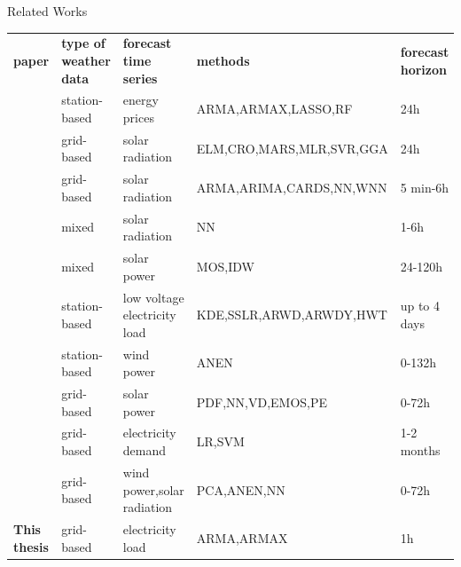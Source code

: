 \documentclass[t,xcolor={table},fleqn]{beamer}
\newcommand{\tcite}{\Textcite}
\begin{document}
\begin{frame}{Related Works}

\vspace{20pt}
\begin{table}[!ht]%
\centering
\tiny
\begin{tabularx}{\linewidth}{lllll}
\textbf{paper} & \textbf{type of weather data} & \textbf{forecast time series} & \textbf{methods} & \textbf{forecast horizon}\\\Xhline{2\arrayrulewidth}
\tcite{Ludwig2015} & station-based & energy prices & ARMA,ARMAX,LASSO,RF & 24h\\
\tcite{Salcedo-Sanz2018} & grid-based & solar radiation & ELM,CRO,MARS,\newline MLR,SVR,GGA & 24h\\
\tcite{Diagne2013} & grid-based & solar radiation & ARMA,ARIMA,CARDS,\newline NN,WNN & 5 min-6h\\\Xhline{2\arrayrulewidth}
\tcite{Aguiar2016} & mixed & solar radiation & NN & 1-6h\\
\tcite{Bofinger2006} & mixed & solar power & MOS,IDW & 24-120h\\
\tcite{Haben2018} & station-based & low voltage electricity load & KDE,SSLR,ARWD,\newline ARWDY,HWT & up to 4 days\\
\tcite{Alessandrini2015} & station-based & wind power & ANEN & 0-132h\\\Xhline{2\arrayrulewidth}
\tcite{Sperati2016} & grid-based & solar power & PDF,NN,VD,EMOS,PE & 0-72h\\
\tcite{DeFelice2015} & grid-based & electricity demand & LR,SVM & 1-2 months\\
\tcite{Davo2016} & grid-based & wind power,solar radiation & PCA,ANEN,NN & 0-72h\\\Xhline{2\arrayrulewidth}
\textbf{This thesis} & grid-based & electricity load & ARMA,ARMAX & 1h\\
\end{tabularx}
\label{tab:relwork}
\end{table}

\end{frame}
\end{document}
